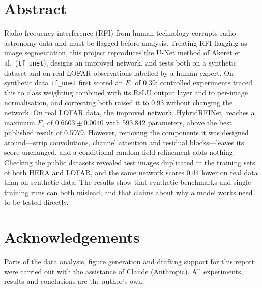 \documentclass[12pt,a4paper,oneside]{report}
\newcommand{\tfunet}{\texttt{tf\_unet}}
\newcommand{\hybrid}{HybridRFINet}
\newcommand{\Fone}{$F_1$}
\begin{document}
\chapter*{Abstract}
Radio frequency interference (RFI) from human technology corrupts radio
astronomy data and must be flagged before analysis. Treating RFI flagging as
image segmentation, this project reproduces the U-Net method of Akeret et al.\
(\tfunet{}), designs an improved network, and tests both on a synthetic
dataset and on real LOFAR observations labelled by a human expert. On synthetic
data \tfunet{} first scored an \Fone{} of 0.39; controlled experiments traced this
to class weighting combined with its ReLU output layer and to per-image
normalisation, and correcting both raised it to 0.93 without changing the
network. On real LOFAR data, the improved network, \hybrid{}, reaches a maximum
\Fone{} of $0.6603 \pm 0.0040$ with 593{,}842 parameters, above the best published
result of 0.5979. However, removing the components it was designed around---strip
convolutions, channel attention and residual blocks---leaves its score
unchanged, and a conditional random field refinement adds nothing. Checking the
public datasets revealed test images duplicated in the training sets of both
HERA and LOFAR, and the same network scores 0.44 lower on real data than on
synthetic data. The results show that synthetic benchmarks and single training
runs can both mislead, and that claims about why a model works need to be
tested directly.

\chapter*{Acknowledgements}
Parts of the data analysis, figure generation and drafting support for this
report were carried out with the assistance of Claude (Anthropic). All
experiments, results and conclusions are the author's own.

\tableofcontents
\listoffigures
\listoftables

\clearpage
{}










\appendix



\end{document}
